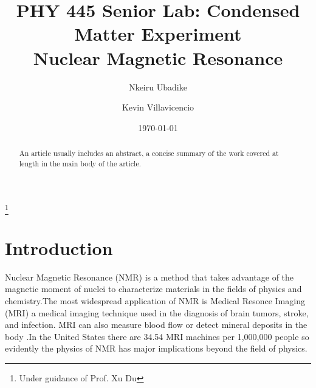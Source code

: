 \documentclass[%
 reprint,
 amsmath,amssymb,
 aps,
]{revtex4-2}
\begin{document}

\title{PHY 445 Senior Lab: Condensed Matter Experiment\\Nuclear Magnetic Resonance}%
\thanks{Under guidance of Prof. Xu Du}%

\author{Nkeiru Ubadike}
 \altaffiliation[Also at ]{}%
\author{Kevin Villavicencio}%
%





\date{\today}%

\begin{abstract}
An article usually includes an abstract, a concise summary of the work
covered at length in the main body of the article. 

\end{abstract}

\maketitle


\section{\label{sec:level1}Introduction}

Nuclear Magnetic Resonance (NMR) is a method that takes advantage of the magnetic moment of nuclei to characterize materials in the fields of physics and chemistry.The most widespread application of NMR is Medical Resonce Imaging (MRI) a medical imaging technique used in the diagnosis of brain tumors, stroke, and infection. MRI can also measure blood flow or detect mineral deposits in the body \cite{noauthor_neurological_nodate}.In the United States there are 34.54 MRI machines per 1,000,000 people \cite{noauthor_magnetic_nodate} so evidently the physics of NMR has major implications  beyond the field of physics.
\end{document}
